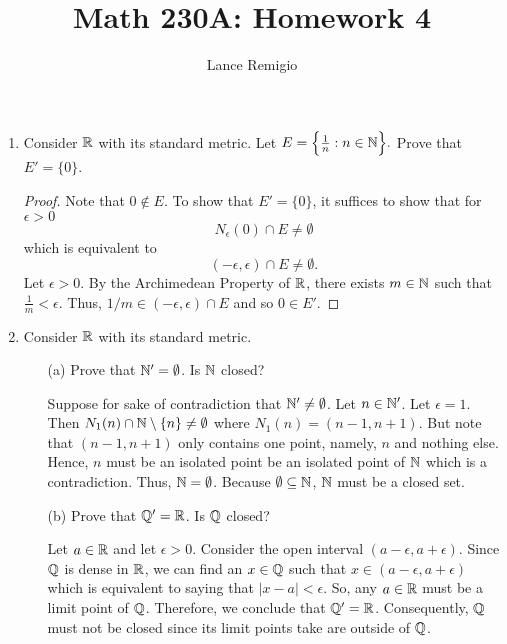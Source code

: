 \documentclass[a4paper]{article}
\title{Math 230A: Homework 4}
\author{Lance Remigio}
\begin{document}
\maketitle    
{}
\rhead{\thepage}

\begin{enumerate}
    \item Consider \( \mathbb{R}  \) with its standard metric. Let \( E = \Big\{ \frac{ 1 }{ n }  : n \in \mathbb{N} \Big\}.    \) Prove that \( E' = \{ 0 \}  \).
        \begin{proof}
        Note that \( 0 \notin E \). To show that \( E' = \{ 0  \}  \), it suffices to show that for \( \epsilon > 0  \)
        \[  {N}_{\epsilon}(0) \cap E \neq \emptyset \]
        which is equivalent to 
        \[  (- \epsilon, \epsilon) \cap E \neq \emptyset. \]
        Let \( \epsilon > 0 \). By the Archimedean Property of \( \mathbb{R}  \), there exists \( m \in \mathbb{N}  \) such that \( \frac{ 1 }{ m }  < \epsilon \). Thus, \( 1/m \in (-\epsilon, \epsilon) \cap E  \) and so \( 0 \in E' \). 
        \end{proof}
    \item Consider \( \mathbb{R}  \) with its standard metric.
        \begin{enumerate}
            \item[(a)] Prove that \( \mathbb{N}' = \emptyset \). Is \( \mathbb{N}  \) closed?
                \begin{solution}
                Suppose for sake of contradiction that \( \mathbb{N}' \neq \emptyset \). Let \( n \in \mathbb{N}' \). Let \( \epsilon = 1  \). Then \( {N}_{1}(n) \cap \mathbb{N} \setminus  \{ n \}  \neq \emptyset \) where \( {N}_{1}(n) = (n-1, n+1) \). But note that \( (n-1, n+1) \) only contains one point, namely, \( n \) and nothing else. Hence, \( n  \) must be an isolated point be an isolated point of \( \mathbb{N}  \) which is a contradiction. Thus, \( \mathbb{N} = \emptyset \). Because \( \emptyset \subseteq  \mathbb{N}  \), \( \mathbb{N}  \) must be a closed set.
                \end{solution}
            \item[(b)] Prove that \( \mathbb{Q}' = \mathbb{R}  \). Is \( \mathbb{Q}  \) closed?
                \begin{solution}
                Let \( a \in \mathbb{R}  \) and let \( \epsilon > 0 \). Consider the open interval \( (a - \epsilon, a + \epsilon) \). Since \( \mathbb{Q}  \) is dense in \( \mathbb{R}  \), we can find an \( x \in \mathbb{Q}  \) such that \( x \in (a- \epsilon, a + \epsilon) \) which is equivalent to saying that \( | x - a  | < \epsilon \). So, any \( a \in \mathbb{R}  \) must be a limit point of \( \mathbb{Q}  \). Therefore, we conclude that \( \mathbb{Q}'= \mathbb{R}  \). Consequently, \( \mathbb{Q}  \) must not be closed since its limit points take are outside of \( \mathbb{Q} \). 

\end{solution}
\end{enumerate}
\end{enumerate}
\end{document}
